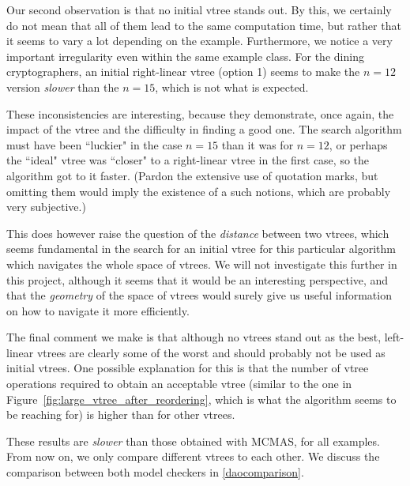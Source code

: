 \documentclass[11pt]{report}
\begin{document}
Our second observation is that no initial vtree stands out. By this, we certainly do not mean that all of them lead to the same computation time, but rather that it seems to vary a lot depending on the example. Furthermore, we notice a very important irregularity even within the same example class. For the dining cryptographers, an initial right-linear vtree (option 1) seems to make the $n=12$ version \textit{slower }than the $n=15$, which is not what is expected. 

These inconsistencies are interesting, because they demonstrate, once again, the impact of the vtree and the difficulty in finding a good one. The search algorithm must have been ``luckier" in the case $n=15$ than it was for $n=12$, or perhaps the ``ideal" vtree was ``closer" to a right-linear vtree in the first case, so the algorithm got to it faster. (Pardon the extensive use of quotation marks, but omitting them would imply the existence of a such notions, which are probably very subjective.)

This does however raise the question of the \textit{distance} between two vtrees, which seems fundamental in the search for an initial vtree for this particular algorithm which navigates the whole space of vtrees. We will not investigate this further in this project, although it seems that it would be an interesting perspective, and that the \textit{geometry} of the space of vtrees would surely give us useful information on how to navigate it more efficiently. 

The final comment we make is that although no vtrees stand out as the best, left-linear vtrees are clearly some of the worst and should probably not be used as initial vtrees. One possible explanation for this is that the number of vtree operations required to obtain an acceptable vtree (similar to the one in Figure~\ref{fig:large_vtree_after_reordering}, which is what the algorithm seems to be reaching for) is higher than for other vtrees. 

These results are \textit{slower} than those obtained with MCMAS, for all examples. From now on, we only compare different vtrees to each other. We discuss the comparison between both model checkers in \ref{daocomparison}. 
\end{document}
